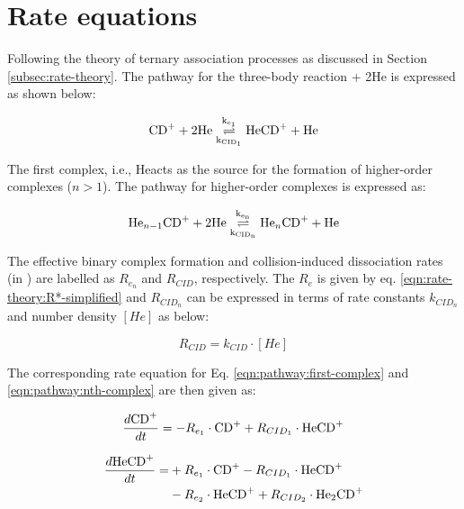 \section{Rate equations}
\label{subsec:rate-equations}

Following the theory of ternary association processes as discussed in Section \ref{subsec:rate-theory}. The pathway for the three-body reaction \CD + 2He is expressed as shown below:

\begin{equation}
    \OverUnder[1]{\cd^+ + 2\he}{\he\cd^+ + \he}
    \label{eqn:pathway:first-complex}
\end{equation}

The first complex, i.e., He\CD acts as the source for the formation of higher-order complexes ($n > 1$).
The pathway for higher-order complexes is expressed as:

\begin{equation}
    \OverUnder[n]{\HenCD[n-1] + 2\he}{\HenCD[n] + \he}
    \label{eqn:pathway:nth-complex}
\end{equation}

The effective binary complex formation and collision-induced dissociation rates (in \pers) are labelled as $R_{e_n}$ and $R_{CID}$, respectively. The $R_{e}$ is given by eq. \ref{eqn:rate-theory:R*-simplified} and $R_{CID_n}$ can be expressed in terms of rate constants $k_{CID_n}$ and number density $[He]$ as below:

\begin{equation}
    R_{CID} = k_{CID} \cdot [He]
    \label{eqn:rate:rcid}
\end{equation}

The corresponding rate equation for Eq. \ref{eqn:pathway:first-complex} and \ref{eqn:pathway:nth-complex} are then given as:

\begin{equation}
    \frac{d\cd^+}{dt} = -R_{e_1} \cdot \cd^+ + R_{CID_1} \cdot \he\cd^+
    \label{eqn:rate:parent-ion}
\end{equation}

\begin{equation*}
    \begin{split}
        \frac{d\text{He}\text{CD}^+}{dt} = & +R_{e_1} \cdot \text{CD}^+ - R_{CID_1} \cdot \text{He}\text{CD}^+ \\
        & -R_{e_2} \cdot \text{He}\text{CD}^+ + R_{CID_2} \cdot \text{He}_2\text{CD}^+
    \end{split}
\end{equation*}

